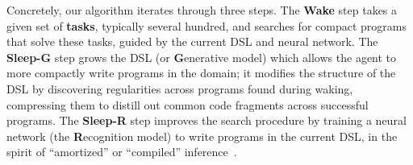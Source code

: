 \documentclass{article}
\newcommand{\system}{\textsc{DreamCoder}~}
\begin{document}
Concretely, our algorithm iterates through three steps. 
The \textbf{Wake} step takes a given set of \textbf{tasks}, typically
several hundred, and searches for compact programs that solve these tasks,
guided by the current DSL and neural network.
The \textbf{Sleep-G} step grows the DSL (or \textbf{G}enerative model) 
which allows the agent to more compactly
write programs in the domain; it modifies the structure of the DSL by
discovering regularities across programs found during waking, compressing
them to distill out common code fragments across successful programs.
The \textbf{Sleep-R} step improves the search procedure by training a neural network (the \textbf{R}ecognition model) to
write programs in the current DSL, in the spirit of ``amortized'' or
``compiled'' inference~\cite{le2016inference}. %


\end{document}
